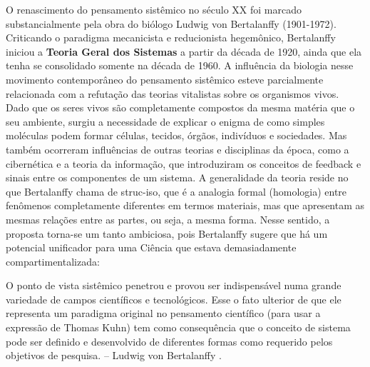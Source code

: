 \documentclass[./main.tex]{subfiles}
\begin{document}
\par O renascimento do pensamento sistêmico no século XX foi marcado substancialmente pela obra do biólogo Ludwig von Bertalanffy (1901-1972). Criticando o paradigma mecanicista e reducionista hegemônico, Bertalanffy iniciou a \textbf{Teoria Geral dos Sistemas} a partir da década de 1920, ainda que ela tenha se consolidado somente na década de 1960. A influência da biologia nesse movimento contemporâneo do pensamento sistêmico esteve parcialmente relacionada com a refutação das teorias vitalistas sobre os organismos vivos. Dado que os seres vivos são completamente compostos da mesma matéria que o seu ambiente, surgiu a necessidade de explicar o enigma de como simples moléculas podem formar células, tecidos, órgãos, indivíduos e sociedades. Mas também ocorreram influências de outras teorias e disciplinas da época, como a cibernética e a teoria da informação, que introduziram os conceitos de \gls{feedback} e sinais entre os componentes de um sistema. A generalidade da teoria reside no que Bertalanffy chama de \gls{struc-iso}, que é a analogia formal (homologia) entre fenômenos completamente diferentes em termos materiais, mas que apresentam as mesmas relações entre as partes, ou seja, a mesma forma. Nesse sentido, a proposta torna-se um tanto ambiciosa, pois Bertalanffy sugere que há um potencial unificador para uma Ciência que estava demasiadamente compartimentalizada:
\begin{adjustwidth}{100pt}{0pt}
\medskip
\small O ponto de vista sistêmico penetrou e provou ser indispensável numa grande variedade de campos científicos e tecnológicos. Esse o fato ulterior de que ele representa um paradigma original no pensamento científico (para usar a expressão de Thomas Kuhn) tem como consequência que o conceito de sistema pode ser definido e desenvolvido de diferentes formas como requerido pelos objetivos de pesquisa. -- Ludwig von Bertalanffy \cite{bertalanffy}.
\medskip
\end{adjustwidth}
\end{document}
